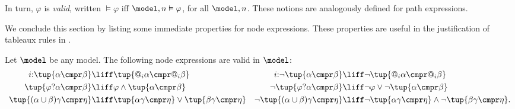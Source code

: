 \begin{defi}
  In turn, $\varphi$ is \emph{valid}, written $\vDash \varphi$ iff $\model, n \vDash\varphi$, for all $\model, n$.
  These notions are analogously defined for path expressions. 
\end{defi}



We conclude this section by listing some immediate properties for node expressions.
These properties are useful in the justification of tableaux rules in .

\begin{prop}\label{prop:equivalences}
  Let $\model$ be any model. The following node expressions are valid in $\model$:
  \begin{align*}
    i{:}\tup{\alpha \cmpr \beta}
      & \liff \tup{@_i\alpha \cmpr @_i\beta} &
    i{:}\lnot\tup{\alpha \cmpr \beta}
      & \liff \lnot\tup{@_i\alpha \cmpr @_i\beta} \\
    \tup{\varphi?\alpha \cmpr \beta}
      & \liff \varphi \land \tup{\alpha \cmpr \beta} &
    \lnot\tup{\varphi?\alpha \cmpr \beta}
      & \liff \lnot\varphi \lor \lnot\tup{\alpha \cmpr \beta} \\
    \tup{(\alpha \cup \beta)\gamma \cmpr \eta}
      & \liff \tup{\alpha\gamma \cmpr \eta} \lor \tup{\beta\gamma \cmpr \eta} &
    \lnot\tup{(\alpha \cup \beta)\gamma \cmpr \eta} & \liff \lnot\tup{\alpha\gamma \cmpr \eta} \land \lnot\tup{\beta\gamma \cmpr \eta}.
  \end{align*}
\end{prop}